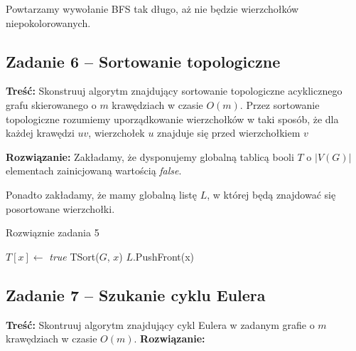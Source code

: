 Powtarzamy wywołanie BFS tak długo, aż nie będzie 
wierzchołków niepokolorowanych.

\subsection{Zadanie 6 -- Sortowanie topologiczne}
\textbf{Treść: } Skonstruuj algorytm znajdujący 
sortowanie topologiczne acyklicznego grafu skierowanego 
o $m$ krawędziach w czasie $O(m)$. 
Przez sortowanie topologiczne rozumiemy uporządkowanie 
wierzchołków w taki sposób, że dla
każdej krawędzi $uv$, wierzchołek $u$ znajduje się przed 
wierzchołkiem $v$

\textbf{Rozwiązanie:} Zakładamy, że dysponujemy globalną
tablicą booli $T$ o $|V(G)|$ elementach zainicjowaną wartością 
\textit{false}.

Ponadto zakładamy, że mamy globalną listę $L$, w której 
będą znajdować się posortowane wierzchołki.

\begin{algorithm}[H]
	\caption{Rozwiąznie zadania 5}
	\begin{algorithmic}[1]
		\State $T[x] \gets$ \textit{true}
		\State TSort($G$, $x$)
		\EndIf
		\EndWhile
		\State $L$.PushFront(x)
		\EndProcedure
	\end{algorithmic}
	\label{Zadanie26}
\end{algorithm}

\subsection{Zadanie 7 -- Szukanie cyklu Eulera}
\textbf{Treść: } Skontruuj algorytm znajdujący cykl Eulera 
w zadanym grafie o $m$ krawędziach w czasie $O(m)$.
\textbf{Rozwiązanie: }